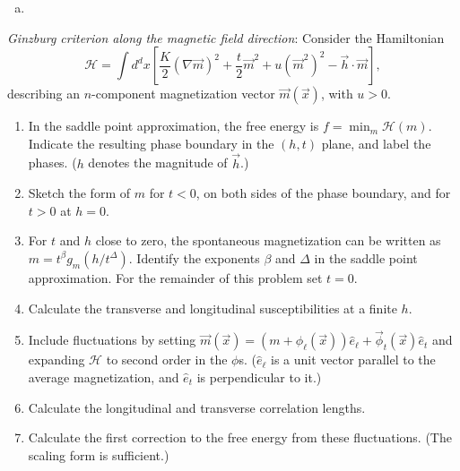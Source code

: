 \begin{solution}
    \begin{enumerate}[(a)]
        \item
    \end{enumerate}
\end{solution}

\begin{problem}
    \textit{Ginzburg criterion along the magnetic field direction}: Consider the Hamiltonian
    \[
        \mathcal{H} = \int d^dx\left[\frac{K}{2}(\nabla\vec{m})^2 + \frac{t}{2}\vec{m}^2 + u(\vec{m}^2)^2 - \vec{h}\cdot\vec{m}\right],
    \]
    describing an $n$-component magnetization vector $\vec{m}(\vec{x})$, with $u > 0$.

    \begin{enumerate}
        \item[(a)] In the saddle point approximation, the free energy is $f = \min_m \mathcal{H}(m)$. Indicate the resulting phase boundary in the $(h,t)$ plane, and label the phases. ($h$ denotes the magnitude of $\vec{h}$.)

        \item[(b)] Sketch the form of $m$ for $t < 0$, on both sides of the phase boundary, and for $t > 0$ at $h = 0$.

        \item[(c)] For $t$ and $h$ close to zero, the spontaneous magnetization can be written as $m = t^\beta g_m(h/t^\Delta)$. Identify the exponents $\beta$ and $\Delta$ in the saddle point approximation. For the remainder of this problem set $t = 0$.

        \item[(d)] Calculate the transverse and longitudinal susceptibilities at a finite $h$.

        \item[(e)] Include fluctuations by setting $\vec{m}(\vec{x}) = (m + \phi_\ell(\vec{x}))\hat{e}_\ell + \vec{\phi}_t(\vec{x})\hat{e}_t$ and expanding $\mathcal{H}$ to second order in the $\phi$s. ($\hat{e}_\ell$ is a unit vector parallel to the average magnetization, and $\hat{e}_t$ is perpendicular to it.)

        \item[(f)] Calculate the longitudinal and transverse correlation lengths.

        \item[(g)] Calculate the first correction to the free energy from these fluctuations. (The scaling form is sufficient.)


\end{enumerate}
\end{problem}
